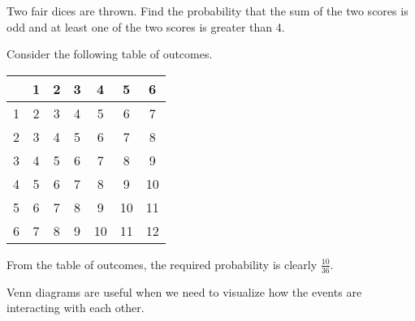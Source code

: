 \begin{sample}
    Two fair dices are thrown. Find the probability that the sum of the two scores is odd and at least one of the two scores is greater than 4.
\end{sample}
\begin{sampans}
    Consider the following table of outcomes.
    \begin{center}
        \begin{tabular}{|c|c|c|c|c|c|c|}
            \hline  & 1 & 2 & 3 & 4 & 5 & 6\\\hline
            1 & 2 & 3 & 4 & 5 & 6 & \cellcolor{ForestGreen!20}7 \\ \hline
            2 & 3 & 4 & 5 & 6 & \cellcolor{ForestGreen!20}7 & 8 \\ \hline
            3 & 4 & 5 & 6 & 7 & 8 & \cellcolor{ForestGreen!20}9 \\ \hline
            4 & 5 & 6 & 7 & 8 & \cellcolor{ForestGreen!20}9 & 10 \\ \hline
            5 & 6 & \cellcolor{ForestGreen!20}7 & 8 & \cellcolor{ForestGreen!20}9 & 10 & \cellcolor{ForestGreen!20}11 \\ \hline
            6 & \cellcolor{ForestGreen!20}7 & 8 & \cellcolor{ForestGreen!20}9 & 10 & \cellcolor{ForestGreen!20}11 & 12 \\ \hline
          \end{tabular}
    \end{center}
    From the table of outcomes, the required probability is clearly $\frac{10}{36}$.
\end{sampans}

\begin{recipe}
    Venn diagrams are useful when we need to visualize how the events are interacting with each other.
\end{recipe}

